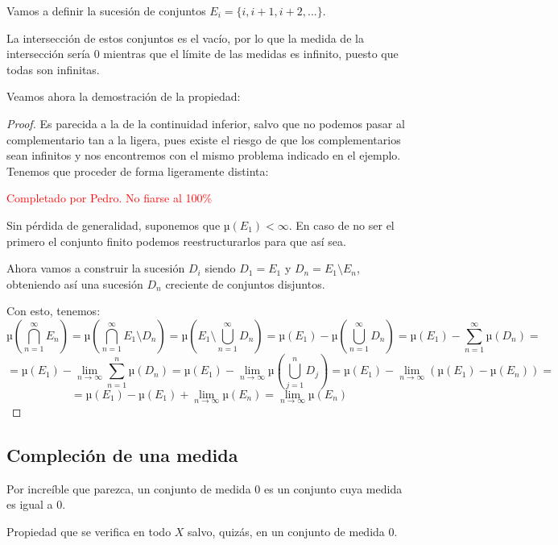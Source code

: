 \documentclass{apuntes}
\begin{document}
\begin{enumerate}
\begin{example}
Vamos a definir la sucesión de conjuntos $E_i=\{i, i+1, i+2,...\}$.

La intersección de estos conjuntos es el vacío, por lo que la medida de la intersección sería 0 mientras que el límite de las medidas es infinito, puesto que todas son infinitas.
\end{example}

Veamos ahora la demostración de la propiedad:

\begin{proof}
Es parecida a la de la continuidad inferior, salvo que no podemos pasar al complementario tan a la ligera, pues existe el riesgo de que los complementarios sean infinitos y nos encontremos con el mismo problema indicado en el ejemplo. Tenemos que proceder de forma ligeramente distinta:

\textcolor{red}{Completado por Pedro. No fiarse al 100\%}

Sin pérdida de generalidad, suponemos que $µ(E_1) < \infty$. En caso de no ser el primero el conjunto finito podemos reestructurarlos para que así sea.

Ahora vamos a construir la sucesión $D_i$ siendo $D_1=E_1$ y $D_n=E_1\setminus E_n$, obteniendo así una sucesión $D_n$ creciente de conjuntos disjuntos.

Con esto, tenemos:
\[µ(\bigcap_{n=1}^{\infty}E_n) = µ(\bigcap_{n=1}^{\infty}E_1\setminus D_n) = µ(E_1 \setminus \bigcup_{n=1}^{\infty}D_n) = µ(E_1) - µ(\bigcup_{n=1}^{\infty}D_n) = µ(E_1) - \sum_{n=1}^{\infty}µ(D_n) =\]
\[=µ(E_1) - \lim_{n \to \infty} \sum_{n=1}^{n}µ(D_n) = µ(E_1) - \lim_{n \to \infty}µ(\bigcup_{j=1}^{n}D_j) = µ(E_1)-\lim_{n \to \infty}(µ(E_1)-µ(E_n))=\]
\[= µ(E_1)-µ(E_1)+\lim_{n \to \infty}µ(E_n)=\lim_{n \to \infty}µ(E_n)\]

\end{proof}
\end{enumerate}

\subsection{Compleción de una medida}

\begin{defn}[Medida 0]
Por increíble que parezca, un conjunto de medida 0 es un conjunto cuya medida es igual a 0.
\end{defn}

\begin{defn}
Propiedad que se verifica en todo $X$ salvo, quizás, en un conjunto de medida 0.
\end{defn}
\end{document}
